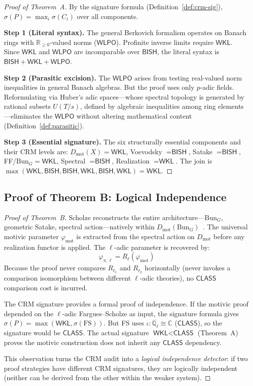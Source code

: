 \documentclass[11pt,a4paper]{article}
\theoremstyle{plain}
\theoremstyle{definition}
\newcommand{\BISH}{\textsf{BISH}}
\newcommand{\WKL}{\textsf{WKL}}
\newcommand{\WLPO}{\textsf{WLPO}}
\newcommand{\CLASS}{\textsf{CLASS}}
\newcommand{\Dmot}{D_{\mathrm{mot}}}
\newcommand{\Bun}{\mathrm{Bun}}
\newcommand{\Q}{\mathbb{Q}}
\newcommand{\R}{\mathbb{R}}
\newcommand{\C}{\mathbb{C}}
\newcommand{\sig}{\sigma}
\begin{document}
\begin{proof}[Proof of Theorem~A]
By the signature formula (Definition~\ref{def:crm-sig}), $\sig(P) = \max_i \sig(C_i)$ over all components.

\textbf{Step 1 (Literal syntax).} The general Berkovich formalism operates on Banach rings with $\R_{\geq 0}$-valued norms ($\WLPO$). Profinite inverse limits require $\WKL$. Since $\WKL$ and $\WLPO$ are incomparable over $\BISH$, the literal syntax is $\BISH + \WKL + \WLPO$.

\textbf{Step 2 (Parasitic excision).} The $\WLPO$ arises from testing real-valued norm inequalities in general Banach algebras. But the proof uses only $p$-adic fields. Reformulating via Huber's adic spaces---whose spectral topology is generated by rational subsets $U(T/s)$, defined by algebraic inequalities among ring elements---eliminates the $\WLPO$ without altering mathematical content (Definition~\ref{def:parasitic}).

\textbf{Step 3 (Essential signature).} The six structurally essential components and their CRM levels are: $\Dmot(X) = \WKL$, Voevodsky $= \BISH$, Satake $= \BISH$, FF/$\Bun_G = \WKL$, Spectral $= \BISH$, Realization $= \WKL$. The join is $\max(\WKL, \BISH, \BISH, \WKL, \BISH, \WKL) = \WKL$.
\end{proof}

\subsection{Proof of Theorem B: Logical Independence}\label{sec:thmB}

\begin{proof}[Proof of Theorem~B]
Scholze reconstructs the entire architecture---$\Bun_G$, geometric Satake, spectral action---natively within $\Dmot(\Bun_G)$~\cite{scholze-motivic-geometrization}. The universal motivic parameter $\varphi_{\mathrm{mot}}$ is extracted from the spectral action on $\Dmot$ before any realization functor is applied. The $\ell$-adic parameter is recovered by:
\[
\varphi_{\pi, \ell} = R_\ell(\varphi_{\mathrm{mot}})
\]
Because the proof never compares $R_{\ell_1}$ and $R_{\ell_2}$ horizontally (never invokes a comparison isomorphism between different $\ell$-adic theories), no $\CLASS$ comparison cost is incurred.

The CRM signature provides a formal proof of independence. If the motivic proof depended on the $\ell$-adic Fargues--Scholze as input, the signature formula gives $\sig(P) = \max(\WKL, \sig(\text{FS}))$. But FS uses $\iota: \overline{\Q_\ell} \cong \C$ ($\CLASS$), so the signature would be $\CLASS$. The actual signature $\WKL < \CLASS$ (Theorem~A) proves the motivic construction does not inherit any $\CLASS$ dependency.

This observation turns the CRM audit into a \emph{logical independence detector}: if two proof strategies have different CRM signatures, they are logically independent (neither can be derived from the other within the weaker system).
\end{proof}
\end{document}
